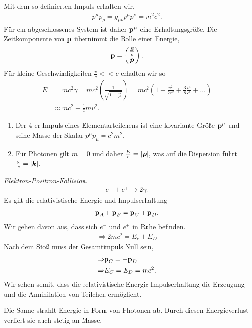 Mit dem so definierten Impuls erhalten wir,
\begin{align*}
p^\mu p_\mu =g_{\mu\nu} p^\mu p^\nu = m^2c^2.
\end{align*}
Für ein abgeschlossenes System ist daher $\bm{\mathrm{p}}^\mu$ eine
Erhaltungsgröße. Die Zeitkomponente von $\bm{\mathrm{p}}$ übernimmt die Rolle einer Energie,
\begin{align*}
\bm{\mathrm{p}}  = \begin{pmatrix}\frac{E}{c}\\ \bm{p}\end{pmatrix}.
\end{align*}
Für kleine Geschwindigkeiten $\frac{v}{c} << c$ erhalten wir so 
\begin{align*}
E &= mc^2\gamma = mc^2\left(\frac{1}{\sqrt{1-\frac{v^2}{c^2}}}\right)
= mc^2 \left( 1+ \frac{v^2}{2c^2} + \frac{3}{8}\frac{v^4}{c^4} + \ldots\right)\\
&\approx mc^2 + \frac{1}{2}mv^2. 
\end{align*}
\begin{bemn}[Bemerkungen.]
\begin{enumerate}[label=\arabic{*}.)]
  \item Der 4-er Impuls eines Elementarteilchens ist eine kovariante Größe
  $\bm{\mathrm{p}}^\mu$ und seine Masse der Skalar $p^\mu p_\mu = c^2m^2$.
  \item Für Photonen gilt $m=0$ und daher $\frac{E}{c} = \left|\bm{p}\right|$, was
  auf die Dispersion führt $\frac{\omega}{c} = \left|\bm{k}\right|$.\maphere
\end{enumerate}
\end{bemn}
\begin{bsp}
\textit{Elektron-Positron-Kollision}.
\begin{align*}
e^- + e^+ \longrightarrow 2\gamma.
\end{align*}
Es gilt die relativistische Energie und Impulserhaltung,
\begin{align*}
\bm{\mathrm{p}}_A + \bm{\mathrm{p}}_B = \bm{\mathrm{p}}_C + \bm{\mathrm{p}}_D.
\end{align*} 
Wir gehen davon aus, dass sich $e^-$ und $e^+$ in Ruhe befinden.
\begin{align*}
\Rightarrow 2mc^2 = E_c+ E_D
\end{align*}
Nach dem Stoß muss der Gesamtimpuls Null sein,
\begin{align*}
\Rightarrow &\bm{\mathrm{p}}_C = -\bm{\mathrm{p}}_D\\
\Rightarrow &E_C = E_D = mc^2.
\end{align*}
Wir sehen somit, dass die relativistische Energie-Impulserhaltung die Erzeugung
und die Annihilation von Teilchen ermöglicht.\bsphere
\end{bsp}
\begin{bsp}
Die Sonne strahlt Energie in Form von Photonen ab. Durch diesen Energieverlust
verliert sie auch stetig an Masse.\bsphere
\end{bsp}

